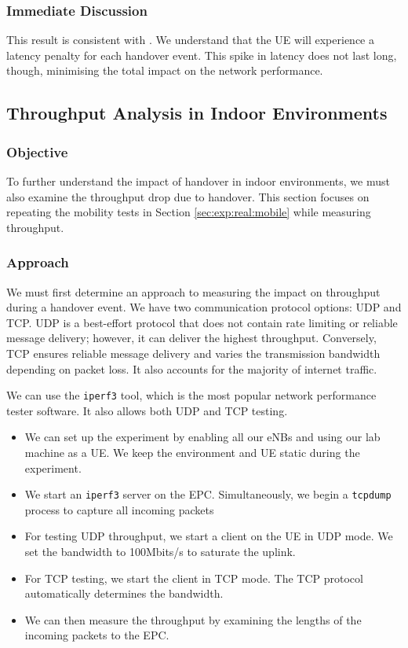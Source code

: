 \subsubsection{Immediate Discussion}
This result is consistent with \citet{zhang_performance_2012}. We understand that the UE will experience a latency penalty for each handover event. This spike in latency does not last long, though, minimising the total impact on the network performance.

\subsection{Throughput Analysis in Indoor Environments}

\subsubsection{Objective}
To further understand the impact of handover in indoor environments, we must also examine the throughput drop due to handover. This section focuses on repeating the mobility tests in Section \ref{sec:exp:real:mobile} while measuring throughput.

\subsubsection{Approach}
We must first determine an approach to measuring the impact on throughput during a handover event. We have two communication protocol options: UDP and TCP. UDP is a best-effort protocol that does not contain rate limiting or reliable message delivery; however, it can deliver the highest throughput. Conversely, TCP ensures reliable message delivery and varies the transmission bandwidth depending on packet loss. It also accounts for the majority of internet traffic. 

We can use the \texttt{iperf3} tool, which is the most popular network performance tester software. It also allows both UDP and TCP testing.

\begin{itemize}
    \item We can set up the experiment by enabling all our eNBs and using our lab machine as a UE. We keep the environment and UE static during the experiment.
    \item We start an \texttt{iperf3} server on the EPC. Simultaneously, we begin a \texttt{tcpdump} process to capture all incoming packets
    \item For testing UDP throughput, we start a client on the UE in UDP mode. We set the bandwidth to 100Mbits/s to saturate the uplink.
    \item For TCP testing, we start the client in TCP mode. The TCP protocol automatically determines the bandwidth.
    \item We can then measure the throughput by examining the lengths of the incoming packets to the EPC.
\end{itemize}

